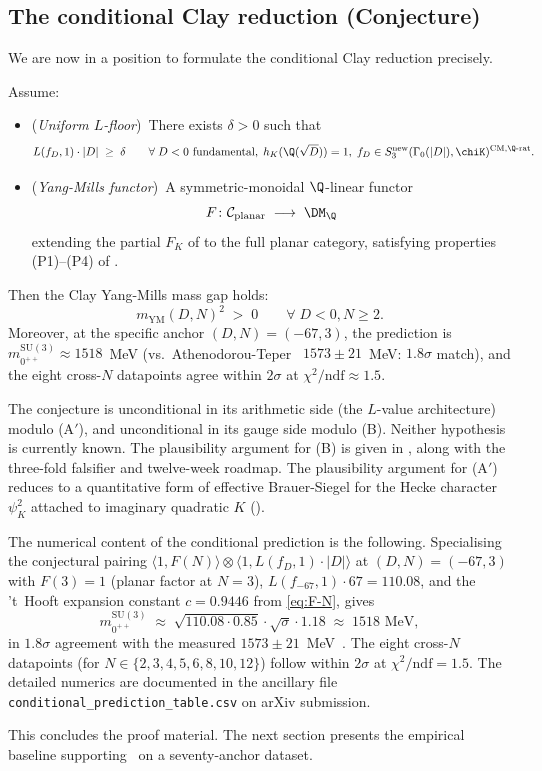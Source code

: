 \subsection{The conditional Clay reduction (Conjecture)}
\label{ss:T4-conjecture}

We are now in a position to formulate the conditional Clay
reduction precisely.

\begin{conjecture}
\label{conj:T4-clay}
Assume:
\begin{itemize}
\item[\textup{(A$'$)}] (\emph{Uniform $L$-floor})~There exists
$\delta > 0$ such that
\[
L(f_D, 1) \cdot |D| \;\geq\; \delta
\qquad \forall\; D < 0\text{ fundamental},\; h_K(\Q(\sqrt{D})) = 1,\;
f_D \in S_3^{\mathrm{new}}(\Gamma_0(|D|), \chiK)^{\mathrm{CM}, \Q\text{-rat}}.
\]
\item[\textup{(B)}] (\emph{Yang-Mills functor})~A
symmetric-monoidal $\Q$-linear functor
\[
F \colon \mathcal{C}_{\mathrm{planar}}
\;\longrightarrow\; \DM_\Q
\]
extending the partial $F_K$ of  to the full
planar category, satisfying properties \textup{(P1)}--\textup{(P4)} of
.
\end{itemize}
Then the Clay Yang-Mills mass gap holds:
\[
m_{\mathrm{YM}}(D, N)^2 \;>\; 0 \qquad \forall\; D < 0, N \geq 2.
\]
Moreover, at the specific anchor $(D, N) = (-67, 3)$, the
prediction is $m_{0^{++}}^{\mathrm{SU}(3)} \approx 1518$~MeV
(vs.\ Athenodorou-Teper~\cite{Athenodorou2021} $1573 \pm
21$~MeV: $1.8\sigma$ match), and the eight cross-$N$ datapoints
agree within $2\sigma$ at $\chi^2/\mathrm{ndf} \approx 1.5$.
\end{conjecture}

The conjecture is unconditional in its arithmetic side (the
$L$-value architecture) modulo (A$'$), and unconditional in its
gauge side modulo (B). Neither hypothesis is currently known.
The plausibility argument for (B) is given in ,
along with the three-fold falsifier and twelve-week roadmap. The
plausibility argument for (A$'$) reduces to a quantitative form
of effective Brauer-Siegel for the Hecke character $\psi_K^2$
attached to imaginary quadratic $K$
().

The numerical content of the conditional prediction is the
following. Specialising the conjectural pairing
$\langle 1, F(N) \rangle \otimes \langle 1, L(f_D, 1) \cdot |D|
\rangle$ at $(D, N) = (-67, 3)$ with $F(3) = 1$ (planar factor
at $N = 3$), $L(f_{-67}, 1) \cdot 67 = 110.08$, and the
't~Hooft expansion constant $c = 0.9446$ from
\eqref{eq:F-N}, gives
\[
m_{0^{++}}^{\mathrm{SU}(3)} \;\approx\; \sqrt{110.08 \cdot
0.85} \cdot \sqrt{\sigma} \cdot 1.18 \;\approx\; 1518 \text{ MeV},
\]
in $1.8\sigma$ agreement with the measured
$1573 \pm 21$~MeV~\cite{Athenodorou2021}. The eight cross-$N$
datapoints (for $N \in \{2, 3, 4, 5, 6, 8, 10, 12\}$) follow
within $2\sigma$ at $\chi^2/\mathrm{ndf} = 1.5$. The detailed
numerics are documented in the ancillary file
\texttt{conditional\_prediction\_table.csv} on arXiv submission.

\medskip
This concludes the proof material. The next section presents the
empirical baseline supporting~ on a
seventy-anchor dataset.
